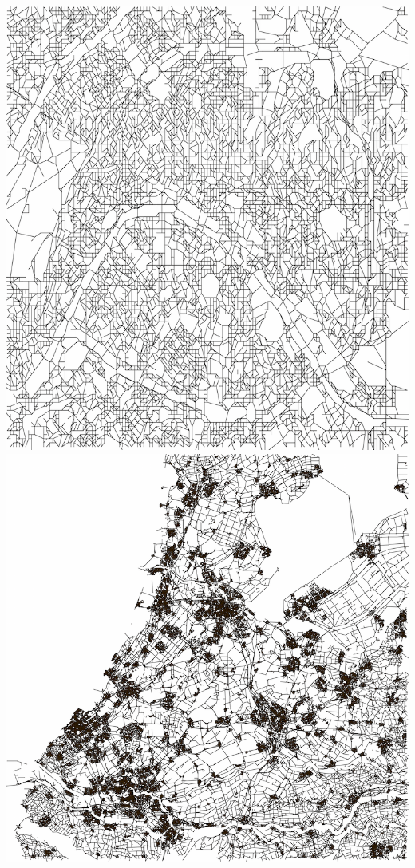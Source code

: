 \documentclass[english,11pt]{beamer}
\begin{document}
{\begin{columns}
\centering
\includegraphics[width=\textwidth]{figures/nwanal_paris_lowres.png}\\
\includegraphics[width=\textwidth]{figures/nwanal_randstad_lowres.png}

\end{columns}}
\end{document}
